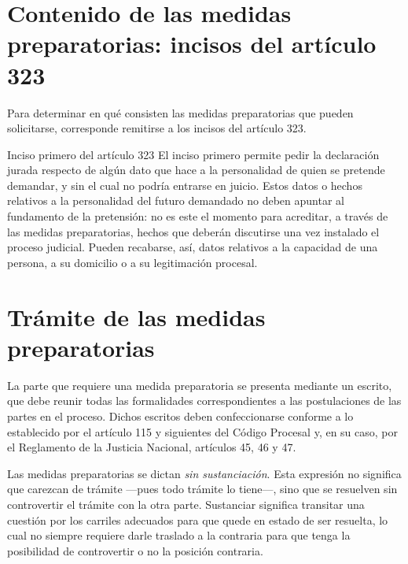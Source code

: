 \documentclass[12pt,oneside]{book}
\begin{document}
\section{Contenido de las medidas preparatorias: incisos del artículo 323}

Para determinar en qué consisten las medidas preparatorias que pueden solicitarse, corresponde remitirse a los incisos del artículo 323.

\begin{example}{Inciso primero del artículo 323}
El inciso primero permite pedir la declaración jurada respecto de algún dato que hace a la personalidad de quien se pretende demandar, y sin el cual no podría entrarse en juicio. Estos datos o hechos relativos a la personalidad del futuro demandado no deben apuntar al fundamento de la pretensión: no es este el momento para acreditar, a través de las medidas preparatorias, hechos que deberán discutirse una vez instalado el proceso judicial. Pueden recabarse, así, datos relativos a la capacidad de una persona, a su domicilio o a su legitimación procesal.
\end{example}


\section{Trámite de las medidas preparatorias}

La parte que requiere una medida preparatoria se presenta mediante un escrito, que debe reunir todas las formalidades correspondientes a las postulaciones de las partes en el proceso. Dichos escritos deben confeccionarse conforme a lo establecido por el artículo 115 y siguientes del Código Procesal y, en su caso, por el Reglamento de la Justicia Nacional, artículos 45, 46 y 47.

\begin{note}
Las medidas preparatorias se dictan \textit{sin sustanciación}. Esta expresión no significa que carezcan de trámite —pues todo trámite lo tiene—, sino que se resuelven sin controvertir el trámite con la otra parte. Sustanciar significa transitar una cuestión por los carriles adecuados para que quede en estado de ser resuelta, lo cual no siempre requiere darle traslado a la contraria para que tenga la posibilidad de controvertir o no la posición contraria.
\end{note}
\end{document}
